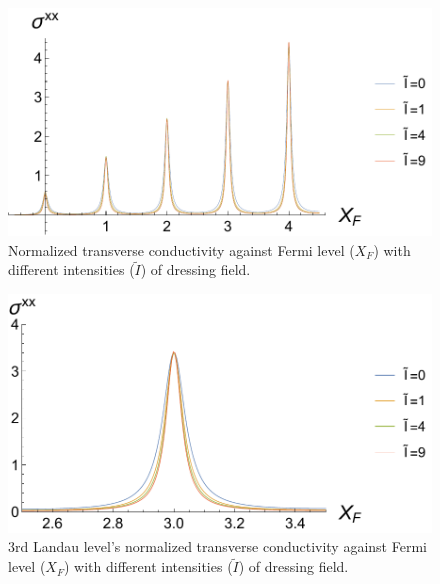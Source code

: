 \begin{figure}[ht!]
  \centering
  \includegraphics[scale=1]{figures/fig81.pdf}
  \caption{Normalized transverse conductivity against Fermi level ($X_F$) with different intensities ($\tilde{I}$) of dressing field.}
  \label{fig:8.1}
\end{figure}
\begin{figure}[ht!]
  \centering
  \includegraphics[scale=1]{figures/fig82.pdf}
  \caption{$3$rd Landau level's normalized transverse conductivity against Fermi level ($X_F$) with different intensities ($\tilde{I}$) of dressing field.}
  \label{fig:8.2}
\end{figure}
